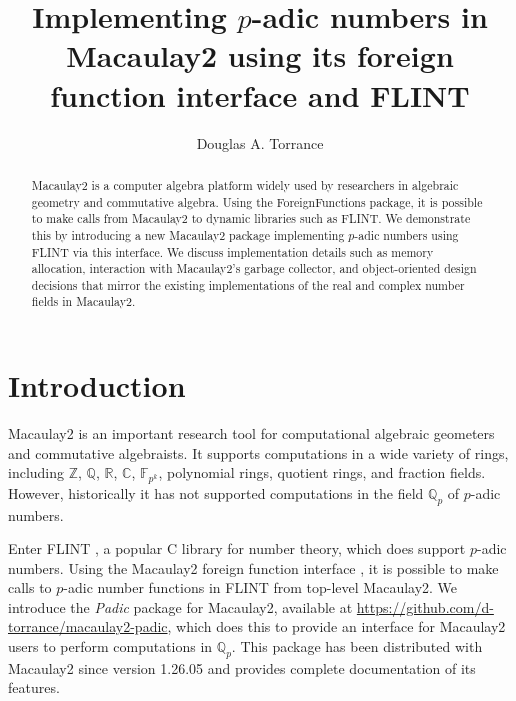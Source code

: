 \documentclass[runningheads]{llncs}
\newcommand{\CC}{\mathbb C}
\newcommand{\FF}{\mathbb F}
\newcommand{\QQ}{\mathbb Q}
\newcommand{\RR}{\mathbb R}
\newcommand{\ZZ}{\mathbb Z}
\begin{document}
%
\title{Implementing $p$-adic numbers in Macaulay2 using its foreign function interface and FLINT}


%
\author{Douglas A. Torrance}
%
%

\maketitle              %
%
\begin{abstract}
  Macaulay2 is a computer algebra platform widely used by researchers in algebraic geometry and commutative algebra. Using the ForeignFunctions package, it is possible to make calls from Macaulay2 to dynamic libraries such as FLINT. We demonstrate this by introducing a new Macaulay2 package implementing $p$-adic numbers using FLINT via this interface. We discuss implementation details such as memory allocation, interaction with Macaulay2’s garbage collector, and object-oriented design decisions that mirror the existing implementations of the real and complex number fields in Macaulay2.
\end{abstract}
%
%
%
\section{Introduction}

Macaulay2 \cite{M2} is an important research tool for computational algebraic geometers and commutative algebraists.  It supports computations in a wide variety of rings, including $\ZZ$, $\QQ$, $\RR$, $\CC$, $\FF_{p^k}$, polynomial rings, quotient rings, and fraction fields.  However, historically it has not supported computations in the field $\QQ_p$ of $p$-adic numbers.

Enter FLINT \cite{flint}, a popular C library for number theory, which does support $p$-adic numbers.  Using the Macaulay2 foreign function interface \cite{foreign-functions}, it is possible to make calls to $p$-adic number functions in FLINT from top-level Macaulay2.  We introduce the \textit{Padic} package for Macaulay2, available at \url{https://github.com/d-torrance/macaulay2-padic}, which does this to provide an interface for Macaulay2 users to perform computations in $\QQ_p$.  This package has been distributed with Macaulay2 since version 1.26.05 and provides complete documentation of its features.
\end{document}
